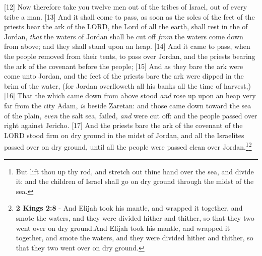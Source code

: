 [12] \textcolor[cmyk]{0.99998,1,0,0}{Now therefore take you twelve men out of the tribes of Israel, out of every tribe a man.}
[13] \textcolor[cmyk]{0.99998,1,0,0}{And it shall come to pass, as soon as the soles of the feet of the priests  bear the ark of the LORD, the Lord of all the earth, shall rest in the  of Jordan, \emph{that} the waters of Jordan shall be cut off \emph{from} the waters  come down from above; and they shall stand upon an heap.}
[14] \textcolor[cmyk]{0.99998,1,0,0}{And it came to pass, when the people removed from their tents, to pass over Jordan, and the priests bearing the ark of the covenant before the people;}
[15] \textcolor[cmyk]{0.99998,1,0,0}{And as they  bare the ark were come unto Jordan, and the feet of the priests  bare the ark were dipped in the brim of the water, (for Jordan overfloweth all his banks all the time of harvest,)}
[16] \textcolor[cmyk]{0.99998,1,0,0}{That the  which came down from above stood \emph{and} rose up upon an heap very far from the city Adam,  \emph{is} beside Zaretan: and those  came down toward the sea of the plain, \emph{even} the salt sea, failed, \emph{and} were cut off: and the people passed over right against Jericho.}
[17] \textcolor[cmyk]{0.99998,1,0,0}{And the priests  bare the ark of the covenant of the LORD stood firm on dry ground in the midst of Jordan, and all the Israelites passed over on dry ground, until all the people were passed clean over Jordan.}\footnote{But lift thou up thy rod, and stretch out thine hand over the sea, and divide it: and the children of Israel shall go on dry ground through the midst of the sea.}\footnote{\textbf{2 Kings 2:8} - And Elijah took his mantle, and wrapped it together, and smote the waters, and they were divided hither and thither, so that they two went over on dry ground.And Elijah took his mantle, and wrapped it together, and smote the waters, and they were divided hither and thither, so that they two went over on dry ground.}